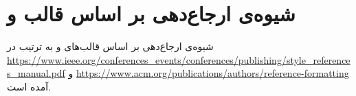 \chapter{شیوه‌ی ارجاع‌دهی بر اساس قالب   و }\label{app7}
شیوه‌ی ارجاع‌دهی بر اساس قالب‌های  و  به ترتیب در  \url{https://www.ieee.org/conferences_events/conferences/publishing/style_references_manual.pdf} و \url{https://www.acm.org/publications/authors/reference-formatting} آمده است.
	
	
